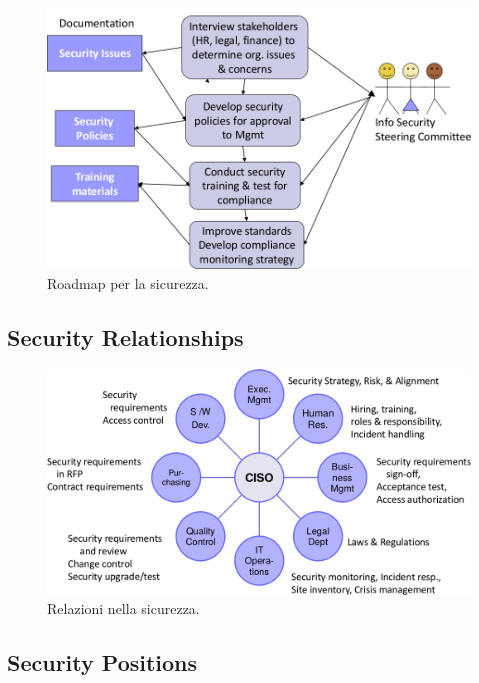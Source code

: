 \begin{figure}[h!]
        \begin{center}
                \includegraphics[scale=0.3]{res/img/roadmap}
        \end{center}
        \caption{Roadmap per la sicurezza.}
\end{figure}

\subsection{Security Relationships}

\begin{figure}[h!]
        \begin{center}
                \includegraphics[scale=0.3]{res/img/relationships}
        \end{center}
        \caption{Relazioni nella sicurezza.}
\end{figure}


\subsection{Security Positions}

